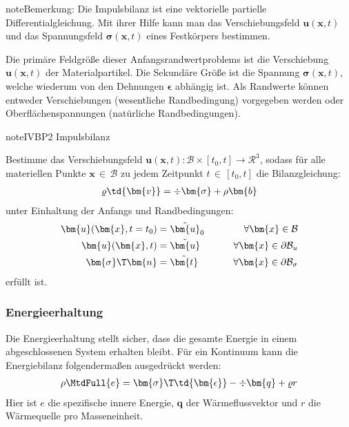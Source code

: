 \documentclass[letterpaper,10pt,german]{jupyterBook}
\begin{document}
\begin{sphinxadmonition}{note}{Bemerkung:}
\sphinxAtStartPar
Die Impulsbilanz ist eine vektorielle partielle Differentialgleichung. Mit ihrer Hilfe kann man das Verschiebungsfeld \(\bm{u}(\bm{x},t)\) und das Spannungsfeld \(\bm{\sigma}(\bm{x},t)\) eines Festkörpers bestimmen.
\end{sphinxadmonition}

\sphinxAtStartPar
Die primäre Feldgröße dieser Anfangsrandwertproblems ist die Verschiebung \(\bm{u}(\bm{x},t)\) der Materialpartikel. Die Sekundäre Größe ist die Spannung \(\bm{\sigma}(\bm{x},t)\), welche wiederum von den Dehnungen \(\bm{\epsilon}\) abhängig ist. Als Randwerte können entweder Verschiebungen (wesentliche Randbedingung) vorgegeben werden oder Oberflächenspannungen (natürliche Randbedingungen).

\begin{sphinxadmonition}{note}{IVBP2 \sphinxhyphen{} Impulsbilanz}

\sphinxAtStartPar
Bestimme das Verschiebungsfeld \(\bm{u}(\bm{x},t): \mathcal{B} \times [t_0,t] \rightarrow \mathcal{R}^3\), sodass für alle materiellen Punkte \(\bm{x} \, \in \, \mathcal{B}\) zu jedem Zeitpunkt \(t \, \in \, [t_0,t]\) die Bilanzgleichung:
\begin{equation*}
\begin{split}
\varrho \td{\bm{v}} =\div{\bm{\sigma}} + \rho \bm{b} 
\end{split}
\end{equation*}
\sphinxAtStartPar
unter Einhaltung der Anfangs\sphinxhyphen{} und Randbedingungen:
\begin{equation*}
\begin{split}
\bm{u}(\bm{x},t=t_0) & = \tilde{\bm{u}}_0 \qquad &\forall \bm{x} \in \mathcal{B}& \\
\bm{u}(\bm{x},t) & = \tilde{\bm{u}} \qquad &\forall \bm{x} \in \partial \mathcal{B}_u& \\
\bm{\sigma}\T \bm{n} & = \tilde{\bm{t}} \qquad &\forall \bm{x} \in \partial\mathcal{B}_{\sigma}&
\end{split}
\end{equation*}
\sphinxAtStartPar
erfüllt ist.
\end{sphinxadmonition}


\subsubsection{Energieerhaltung}
\label{\detokenize{chapters/chapter1/elasticity:energieerhaltung}}
\sphinxAtStartPar
Die Energieerhaltung stellt sicher, dass die gesamte Energie in einem abgeschlossenen System erhalten bleibt. Für ein Kontinuum kann die Energiebilanz folgendermaßen ausgedrückt werden:
\begin{equation}\label{equation:chapters/chapter1/elasticity:1HS_01}
\begin{split}\rho \MtdFull{e} = \bm{\sigma}\T \td{\bm{\epsilon}} - \div{\bm{q}} + \varrho r\end{split}
\end{equation}
\sphinxAtStartPar
Hier ist \(e\) die spezifische innere Energie, \(\bm{q}\) der Wärmeflussvektor und \(r\) die Wärmequelle pro Masseneinheit.
\end{document}
